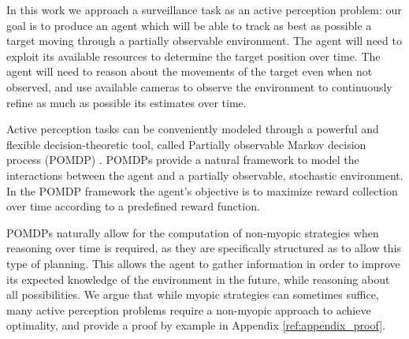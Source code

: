 
In this work we approach a surveillance task as an active perception problem: our goal is to produce
an agent which will be able to track as best as possible a target moving through a partially
observable environment. The agent will need to exploit its available resources to determine the
target position over time. The agent will need to reason about the movements of the target even when
not observed, and use available cameras to observe the environment to continuously refine as much as
possible its estimates over time.


Active perception tasks can be conveniently modeled through a powerful and flexible
decision-theoretic tool, called Partially observable Markov decision process (POMDP)
\cite{cit:pomdp}. POMDPs provide a natural framework to model the interactions between the agent and
a partially observable, stochastic environment.  In the POMDP framework the agent's objective is to
maximize reward collection over time according to a predefined reward function.

POMDPs naturally allow for the computation of non-myopic strategies when reasoning over time is
required, as they are specifically structured as to allow this type of planning. This allows the
agent to gather information in order to improve its expected knowledge of the environment in the
future, while reasoning about all possibilities. We argue that while myopic strategies can sometimes
suffice, many active perception problems require a non-myopic approach to achieve optimality, and
provide a proof by example in Appendix \ref{ref:appendix_proof}.

%


